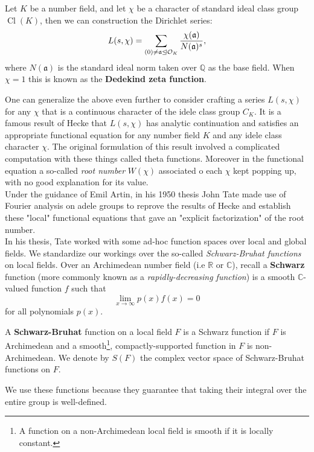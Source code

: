 \documentclass[11pt, x11names]{article}
\newcommand{\qq}{\mathbb{Q}}
\newcommand{\rr}{\mathbb{R}}
\newcommand{\cc}{\mathbb{C}}
\newcommand{\fraka}{\mathfrak{a}}
\newcommand{\ideal}{\trianglelefteq}
\DeclareMathOperator{\cl}{Cl}
\begin{document}
\begin{example}
\label{example: Generalized Dedekind Zeta}
Let $K$ be a number field, and let $\chi$ be a character of standard ideal class group $\cl(K)$, then we can construction the Dirichlet series:
\begin{equation*}
    L(s, \chi) = \sum_{(0) \neq \fraka \ideal \calo_K} \frac{\chi(\fraka)}{N(\fraka)^s},
\end{equation*}
where $N(\fraka)$ is the standard ideal norm taken over $\qq$ as the base field. When $\chi = 1$ this is known as the \textbf{Dedekind zeta function}.
\end{example}

One can generalize the above even further to consider crafting a series $L(s, \chi)$ for any $\chi$ that is a continuous character of the idele class group $C_K$. It is a famous result of Hecke that $L(s, \chi)$ has analytic continuation and satisfies an appropriate functional equation for any number field $K$ and any idele class character $\chi$. The original formulation of this result involved a complicated computation with these things called theta functions. Moreover in the functional equation a so-called \textit{root number} $W(\chi)$ associated o each $\chi$ kept popping up, with no good explanation for its value.\\
Under the guidance of Emil Artin, in his 1950 thesis John Tate made use of Fourier analysis on adele groups to reprove the results of Hecke and establish these "local" functional equations that gave an "explicit factorization" of the root number.\\

In his thesis, Tate worked with some ad-hoc function spaces over local and global fields. We standardize our workings over the so-called \textit{Schwarz-Bruhat functions} on local fields. Over an Archimedean number field (i.e $\rr$ or $\cc$), recall a \textbf{Schwarz} function (more commonly known as a \textit{rapidly-decreasing function}) is a smooth $\cc$-valued function $f$ such that
\begin{equation*}
    \lim_{x \to \infty} p(x)f(x) = 0
\end{equation*}
for all polynomials $p(x)$.
\begin{defn}
\label{def: Schwarz-Bruhat functions}
A \textbf{Schwarz-Bruhat} function on a local field $F$ is a Schwarz function if $F$ is Archimedean and a smooth\footnote{A function on a non-Archimedean local field is smooth if it is locally constant.}, compactly-supported function in $F$ is non-Archimedean. We denote by $S(F)$ the complex vector space of Schwarz-Bruhat functions on $F$.
\end{defn}
We use these functions because they guarantee that taking their integral over the entire group is well-defined.
\end{document}
